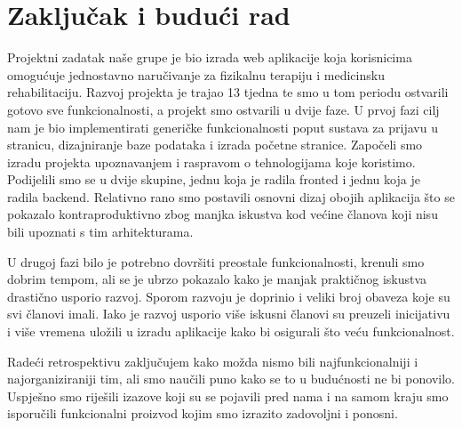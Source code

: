 \chapter{Zaključak i budući rad}

		Projektni zadatak naše grupe je bio izrada  web aplikacije koja korisnicima omogućuje jednostavno naručivanje za fizikalnu terapiju i medicinsku rehabilitaciju. Razvoj projekta je trajao 13 tjedna te smo u tom periodu ostvarili gotovo sve funkcionalnosti, a projekt smo ostvarili u dvije faze. U prvoj fazi cilj nam je bio implementirati generičke funkcionalnosti poput sustava za prijavu u stranicu, dizajniranje baze podataka i izrada početne stranice.
		Započeli smo izradu projekta upoznavanjem i raspravom o tehnologijama koje koristimo. Podijelili smo se u dvije skupine, jednu koja je radila fronted i jednu koja
		je radila backend. Relativno rano smo postavili osnovni dizaj obojih aplikacija što se pokazalo kontraproduktivno zbog manjka iskustva kod većine članova koji nisu
		bili upoznati s tim arhitekturama.
		
		U drugoj fazi bilo je potrebno dovršiti preostale funkcionalnosti, krenuli smo
		dobrim tempom, ali se je ubrzo pokazalo kako je manjak praktičnog iskustva drastično
		usporio razvoj. Sporom razvoju je doprinio i veliki broj obaveza koje su svi članovi
		imali. Iako je razvoj usporio više iskusni članovi su preuzeli inicijativu i više vremena uložili u izradu aplikacije kako bi osigurali što veću funkcionalnost.
	
	
		Radeći retrospektivu zaključujem kako možda nismo bili najfunkcionalniji i
		najorganiziraniji tim, ali smo naučili puno kako se to u budućnosti ne bi ponovilo.
		Uspješno smo riješili izazove koji su se pojavili pred nama i na samom kraju smo
		isporučili funkcionalni proizvod kojim smo izrazito zadovoljni i ponosni.
		\eject 